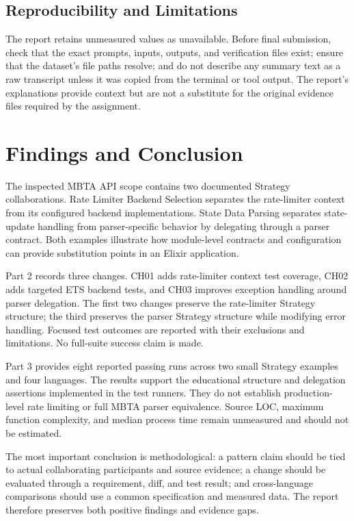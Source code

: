 \documentclass[11pt,a4paper]{article}
\begin{document}
\subsection{Reproducibility and Limitations}
The report retains unmeasured values as unavailable. Before final submission, check that the exact prompts, inputs, outputs, and verification files exist; ensure that the dataset's file paths resolve; and do not describe any summary text as a raw transcript unless it was copied from the terminal or tool output. The report's explanations provide context but are not a substitute for the original evidence files required by the assignment.

\section{Findings and Conclusion}
The inspected MBTA API scope contains two documented Strategy collaborations. Rate Limiter Backend Selection separates the rate-limiter context from its configured backend implementations. State Data Parsing separates state-update handling from parser-specific behavior by delegating through a parser contract. Both examples illustrate how module-level contracts and configuration can provide substitution points in an Elixir application.

Part 2 records three changes. CH01 adds rate-limiter context test coverage, CH02 adds targeted ETS backend tests, and CH03 improves exception handling around parser delegation. The first two changes preserve the rate-limiter Strategy structure; the third preserves the parser Strategy structure while modifying error handling. Focused test outcomes are reported with their exclusions and limitations. No full-suite success claim is made.

Part 3 provides eight reported passing runs across two small Strategy examples and four languages. The results support the educational structure and delegation assertions implemented in the test runners. They do not establish production-level rate limiting or full MBTA parser equivalence. Source LOC, maximum function complexity, and median process time remain unmeasured and should not be estimated.

The most important conclusion is methodological: a pattern claim should be tied to actual collaborating participants and source evidence; a change should be evaluated through a requirement, diff, and test result; and cross-language comparisons should use a common specification and measured data. The report therefore preserves both positive findings and evidence gaps.
\end{document}
